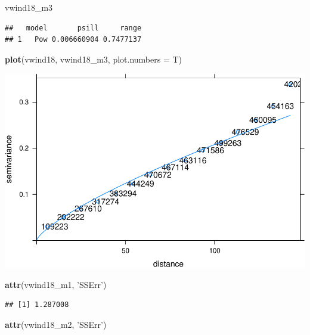\documentclass[11pt,]{article}
\newenvironment{Shaded}{\begin{snugshade}}{\end{snugshade}}
\newcommand{\KeywordTok}[1]{\textcolor[rgb]{0.13,0.29,0.53}{\textbf{#1}}}
\newcommand{\DataTypeTok}[1]{\textcolor[rgb]{0.13,0.29,0.53}{#1}}
\newcommand{\StringTok}[1]{\textcolor[rgb]{0.31,0.60,0.02}{#1}}
\newcommand{\NormalTok}[1]{#1}
\begin{document}
\begin{Shaded}
\begin{Highlighting}[]
\NormalTok{vwind18_m3}
\end{Highlighting}
\end{Shaded}

\begin{verbatim}
##   model       psill     range
## 1   Pow 0.006660904 0.7477137
\end{verbatim}

\begin{Shaded}
\begin{Highlighting}[]
\KeywordTok{plot}\NormalTok{(vwind18, vwind18_m3, }\DataTypeTok{plot.numbers =}\NormalTok{ T)}
\end{Highlighting}
\end{Shaded}

\includegraphics{proyecto_files/figure-latex/unnamed-chunk-42-4.pdf}

\begin{Shaded}
\begin{Highlighting}[]
\KeywordTok{attr}\NormalTok{(vwind18_m1, }\StringTok{'SSErr'}\NormalTok{)}
\end{Highlighting}
\end{Shaded}

\begin{verbatim}
## [1] 1.287008
\end{verbatim}

\begin{Shaded}
\begin{Highlighting}[]
\KeywordTok{attr}\NormalTok{(vwind18_m2, }\StringTok{'SSErr'}\NormalTok{)}
\end{Highlighting}
\end{Shaded}
\end{document}
